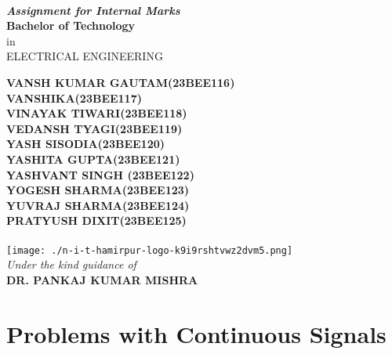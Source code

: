 \documentclass[12pt,a4paper]{report}
\begin{document}
	\begin{center}

		\vspace*{30pt}
		
		\textbf{\\
			\it{Assignment for Internal Marks}\\}
		\vspace{20pt}
		\textbf{Bachelor of Technology\\}
		in\\
		\vspace{3pt}
		{ELECTRICAL ENGINEERING}\\
		\vspace{40pt}
		
		\textbf{
			VANSH KUMAR GAUTAM(23BEE116)\\
                VANSHIKA(23BEE117)\\
                VINAYAK TIWARI(23BEE118)\\
                VEDANSH TYAGI(23BEE119)\\
                YASH SISODIA(23BEE120)\\
                YASHITA GUPTA(23BEE121)\\
                YASHVANT SINGH (23BEE122)\\
                YOGESH SHARMA(23BEE123)\\
                YUVRAJ SHARMA(23BEE124)\\
                PRATYUSH DIXIT(23BEE125)\\
            }\\
            
		\vspace{30pt}
		\texttt{[image: ./n-i-t-hamirpur-logo-k9i9rshtvwz2dvm5.png]} \\
		\vspace{30pt}
		\textit{Under the kind guidance of}\\
		\textbf{DR. PANKAJ KUMAR MISHRA}\\
		\textit
		
		
		\vspace{20pt}
		
	\end{center}

\newpage %

\section*{Problems with Continuous Signals}
\end{document}
